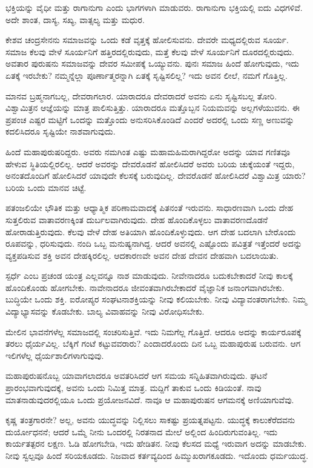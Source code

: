 ಭಕ್ತಿಯನ್ನು ವೈಧೀ ಮತ್ತು ರಾಗಾನುಗಾ ಎಂದು ಭಾಗಗಳಾಗಿ ಮಾಡುವರು. ರಾಗಾನುಗಾ ಭಕ್ತಿಯಲ್ಲಿ ಐದು ವಿಧಗಳಿವೆ. ಅದೇ ಶಾಂತ, ದಾಸ್ಯ, ಸಖ್ಯ, ವಾತ್ಸಲ್ಯ ಮತ್ತು ಮಧುರ.

ಕೇಶವ ಚಂದ್ರಸೇನನು ಸಮಾಜವನ್ನು ಒಂದು ಕಡೆ ವೃತ್ತಕ್ಕೆ ಹೋಲಿಸುವನು. ದೇವರೇ ಮಧ್ಯದಲ್ಲಿರುವ ಸೂರ್ಯ. ಸಮಾಜ ಕೆಲವು ವೇಳೆ ಸೂರ್ಯನಿಗೆ ಹತ್ತಿರದಲ್ಲಿರುವುದು, ಮತ್ತೆ ಕೆಲವು ವೇಳೆ ಸೂರ್ಯನಿಗೆ ದೂರದಲ್ಲಿರುವುದು. ಅವತಾರ ಪುರುಷನು ಸಮಾಜವನ್ನು ದೇವರ ಸಮೀಪಕ್ಕೆ ಒಯ್ಯುವನು. ಪುನಃ ಸಮಾಜ ಹಿಂದೆ ಹೋಗುವುದು, ಇದು ಏತಕ್ಕೆ ಇರಬೇಕು? ನಮ್ಮನ್ನೆಲ್ಲಾ ಪೂರ್ಣಾತ್ಮರನ್ನಾಗಿ ಏತಕ್ಕೆ ಸೃಷ್ಟಿಸಲಿಲ್ಲ? ಇದು ಅವನ ಲೀಲೆ, ನಮಗೆ ಗೊತ್ತಿಲ್ಲ.

ಮಾನವ ಬ್ರಹ್ಮನಾಗಬಲ್ಲ, ದೇವರಾಗಲಾರ. ಯಾರಾದರೂ ದೇವರಾದರೆ ಅವನು ಏನು ಸೃಷ್ಟಿಸಬಲ್ಲ ತೋರಿ. ವಿಶ್ವಾಮಿತ್ರನ ಆಜ್ಞೆಯನ್ನು ಮಾತ್ರ ಪಾಲಿಸುತ್ತಿತ್ತು. ಯಾರಾದರೂ ಮತ್ತೊಬ್ಬನ ನಿಯಮವನ್ನು ಅಲ್ಲಗಳೆಯುವನು. ಈ ಪ್ರಪಂಚ ಎಷ್ಟರ ಮಟ್ಟಿಗೆ ಒಂದನ್ನು ಮತ್ತೊಂದು ಅನುಸರಿಸಿಕೊಂಡಿದೆ ಎಂದರೆ ಅದರಲ್ಲಿ ಒಂದು ಸಣ್ಣ ಅಣುವನ್ನು ಕದಲಿಸಿದರೂ ಸೃಷ್ಟಿಯೇ ನಾಶವಾಗುವುದು.

ಹಿಂದೆ ಮಹಾಪುರುಷರಿದ್ದರು. ಅವರು ನಮಗಿಂತ ಎಷ್ಟು ಮಹಾಮಹಿಮರಾಗಿದ್ದರೋ ಅದನ್ನು ಯಾವ ಗಣಿತವೂ ಹೇಳುವ ಸ್ಥಿತಿಯಲ್ಲಿರಲಿಲ್ಲ. ಆದರೆ ಅವರನ್ನು ದೇವರೊಡನೆ ಹೋಲಿಸಿದರೆ ಅವರು ಬರಿಯ ಚುಕ್ಕೆಯಂತೆ ಇದ್ದರು, ಅನಂತದೊಂದಿಗೆ ಹೋಲಿಸಿದರೆ ಯಾವುದೇ ಕೆಲಸಕ್ಕೆ ಬರುವುದಿಲ್ಲ. ದೇವರೊಡನೆ ಹೋಲಿಸಿದರೆ ವಿಶ್ವಾಮಿತ್ರ ಯಾರು? ಬರಿಯ ಒಂದು ಮಾನವ ಚಿಟ್ಟೆ.

ಪತಂಜಲಿಯೇ ಭೌತಿಕ ಮತ್ತು ಆಧ್ಯಾತ್ಮಿಕ ಪರಿಣಾಮವಾದಕ್ಕೆ ಪಿತನಂತೆ ಇರುವನು. ಸಾಧಾರಣವಾಗಿ ಒಂದು ದೇಹ ಸುತ್ತಲಿರುವ ವಾತಾವರಣಕ್ಕಿಂತ ದುರ್ಬಲವಾಗಿರುವುದು. ದೇಹ ಹೊಂದಿಕೊಳ್ಳಲು ವಾತಾವರಣದೊಡನೆ ಹೋರಾಡುತ್ತಿರುವುದು. ಕೆಲವು ವೇಳೆ ದೇಹ ಅತಿಯಾಗಿ ಹೊಂದಿಕೊಳ್ಳುವುದು. ಆಗ ದೇಹ ಬದಲಾಗಿ ಬೇರೊಂದು ರೂಪವನ್ನು, ಧರಿಸುವುದು. ನಂದಿ ಒಬ್ಬ ಮನುಷ್ಯನಾಗಿದ್ದ. ಆದರೆ ಅವನಲ್ಲಿ ಎಷ್ಟೊಂದು ಪವಿತ್ರತೆ ಇತ್ತೆಂದರೆ ಅದನ್ನು ವ್ಯಕ್ತಪಡಿಸುವ ಶಕ್ತಿ ಅವನ ದೇಹಕ್ಕಿರಲಿಲ್ಲ. ಆದಕಾರಣವೇ ಅವನ ದೇಹ ದೇವನ ದೇಹವಾಗಿ ಬದಲಾಯಿತು.

ಸ್ಪರ್ಧೆ ಎಂಬ ಪ್ರಚಂಡ ಯಂತ್ರ ಎಲ್ಲವನ್ನೂ ನಾಶ ಮಾಡುವುದು. ನೀವೇನಾದರೂ ಬದುಕಬೇಕಾದರೆ ನೀವು ಕಾಲಕ್ಕೆ ಹೊಂದಿಕೊಂಡು ಹೋಗಬೇಕು. ನಾವೇನಾದರೂ ಜೀವಂತವಾಗಿರಬೇಕಾದರೆ ವೈಜ್ಞಾನಿಕ ಜನಾಂಗವಾಗಿರಬೇಕು. ಬುದ್ಧಿಯೇ ಒಂದು ಶಕ್ತಿ. ಐರೋಪ್ಯರ ಸಂಘಟನಾಶಕ್ತಿಯನ್ನು ನೀವು ಕಲಿಯಬೇಕು. ನೀವು ವಿದ್ಯಾವಂತರಾಗಬೇಕು. ನಿಮ್ಮ ವಿದ್ಯಾಭ್ಯಾಸವನ್ನು ಕೊಡಬೇಕು. ಬಾಲ್ಯ ವಿವಾಹವನ್ನು ನೀವು ವಿರೋಧಿಸಬೇಕು.

ಮೇಲಿನ ಭಾವನೆಗಳೆಲ್ಲ ಸಮಾಜದಲ್ಲಿ ಸಂಚರಿಸುತ್ತಿವೆ. ಇದು ನಿಮಗೆಲ್ಲ ಗೊತ್ತಿದೆ. ಆದರೂ ಅದನ್ನು ಕಾರ್ಯರೂಪಕ್ಕೆ ತರಲು ಧೈರ್ಯವಿಲ್ಲ. ಬೆಕ್ಕಿಗೆ ಗಂಟೆ ಕಟ್ಟುವವರಾರು? ಎಂದಾದರೊಂದು ದಿನ ಒಬ್ಬ ಮಹಾಪುರುಷ ಬರುವನು. ಆಗ ಇಲಿಗಳೆಲ್ಲ ಧೈರ್ಯಶಾಲಿಗಳಾಗುವುವು.

ಮಹಾಪುರುಷನೊಬ್ಬ ಯಾವಾಗಲಾದರೂ ಅವತರಿಸಿದರೆ ಆಗ ಸಮಯ ಸನ್ನಿಹಿತವಾಗಿರುವುದು. ಘಟನೆ ಪ್ರಾರಂಭವಾಗುವುದಕ್ಕೆ, ಅವನು ಒಂದು ನಿಮಿತ್ತ ಮಾತ್ರ. ಮದ್ದಿಗೆ ತಾಕುವ ಒಂದು ಕಿಡಿಯಂತೆ. ನಾವು ಮಾತನಾಡುವುದರಲ್ಲಿಯೂ ಒಂದು ಪ್ರಯೋಜನವಿದೆ. ನಾವೂ ಆ ಮಹಾಪುರುಷನ ಆಗಮನಕ್ಕೆ ಅಣಿಯಾಗುವೆವು.

ಕೃಷ್ಣ ತಂತ್ರಗಾರನೇ? ಅಲ್ಲ, ಅವನು ಯುದ್ಧವನ್ನು ನಿಲ್ಲಿಸಲು ಸಾಕಷ್ಟು ಪ್ರಯತ್ನಪಟ್ಟನು. ಯುದ್ಧಕ್ಕೆ ಕಾಲುಕೆರೆದವನು ದುರ್ಯೋಧನನೆ; ಆದರೆ ಒಮ್ಮೆ ನೀನು ಒಂದರಲ್ಲಿ ನಿರತನಾದ ಮೇಲೆ ಅಲ್ಲಿಂದ ಹಿಂದಿರುಗುವಂತಿಲ್ಲ. ಇದು ಕಾರ್ಯತತ್ಪರನ ಲಕ್ಷಣ. ಓಡಿ ಹೋಗಬೇಡಿ, ಇದು ಹೇಡಿತನ. ನೀವು ಕೆಲಸದ ಮಧ್ಯೆ ಇರುವಾಗ ಅದನ್ನು ಮಾಡಬೇಕು. ನೀವು ಸ್ವಲ್ಪವೂ ಹಿಂದೆ ಸರಿಯಕೂಡದು. ನಿಜವಾದ ಕರ್ತವ್ಯದಿಂದ ಹಿಮ್ಮುಖರಾಗಕೂಡದು. ಇದೊಂದು ಧರ್ಮಯುದ್ಧ.

